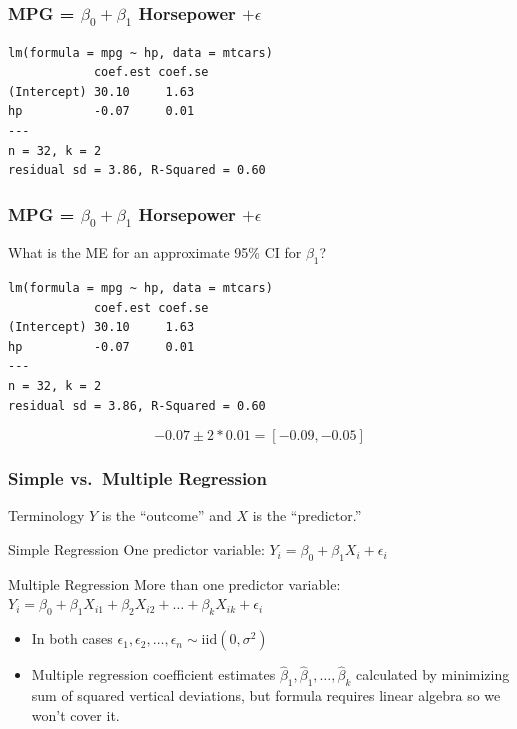 \documentclass{beamer}
\begin{document}



\begin{frame}[fragile]
\frametitle{MPG = $\beta_0 + \beta_1$ Horsepower $+ \epsilon$}
\footnotesize
\begin{verbatim}
lm(formula = mpg ~ hp, data = mtcars)
            coef.est coef.se
(Intercept) 30.10     1.63  
hp          -0.07     0.01  
---
n = 32, k = 2
residual sd = 3.86, R-Squared = 0.60
\end{verbatim}

\end{frame}
\begin{frame}[fragile]
\frametitle{MPG = $\beta_0 + \beta_1$ Horsepower $+ \epsilon$ }
\alert{What is the ME for an approximate 95\% CI for $\beta_1$?}
\footnotesize
\begin{verbatim}
lm(formula = mpg ~ hp, data = mtcars)
            coef.est coef.se
(Intercept) 30.10     1.63  
hp          -0.07     0.01  
---
n = 32, k = 2
residual sd = 3.86, R-Squared = 0.60
\end{verbatim}

\pause
$$
-0.07 \pm 2 * 0.01 = [-0.09, -0.05]
$$
\end{frame}

\begin{frame}
\frametitle{Simple vs.\ Multiple Regression}
\begin{block}{Terminology}
$Y$ is the ``outcome'' and $X$ is the ``predictor.''
\end{block}

\begin{block}{Simple Regression}
One predictor variable: $Y_i = \beta_0 + \beta_1 X_i + \epsilon_i$
\end{block}
\begin{block}{Multiple Regression}
More than one predictor variable: $Y_i = \beta_0 + \beta_1 X_{i1} + \beta_2 X_{i2} +  \hdots + \beta_k X_{ik} + \epsilon_i$
\end{block}


\begin{itemize}
	\item In both cases $\epsilon_1, \epsilon_2, \hdots, \epsilon_n \sim \mbox{iid} (0,\sigma^2)$
	\item Multiple regression coefficient estimates $\widehat{\beta}_1, \widehat{\beta}_1, \hdots, \widehat{\beta}_k$ calculated by minimizing  sum of squared vertical deviations, but formula requires linear algebra so we won't cover it.
\end{itemize}
\end{frame}
\end{document}
